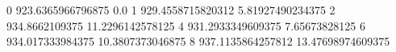0 923.6365966796875 0.0
1 929.4558715820312 5.81927490234375
2 934.8662109375 11.2296142578125
4 931.2933349609375 7.65673828125
6 934.017333984375 10.3807373046875
8 937.1135864257812 13.47698974609375
